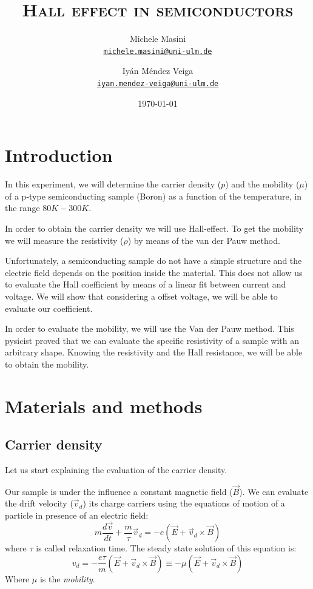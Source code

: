 \documentclass[11pt,a4paper]{article}
\title{\bfseries\textsc{Hall effect in semiconductors}}
\author{
Michele Masini\\ \small\texttt{\href{mailto:michele.masini@uni-ulm.de}{michele.masini@uni-ulm.de}}\and
Iyán Méndez Veiga\\ \small\texttt{\href{mailto:iyan.mendez-veiga@uni-ulm.de}{iyan.mendez-veiga@uni-ulm.de}}
}
\date{\today}
\begin{document}
\maketitle



\section{Introduction}
In this experiment, we will determine the carrier density ($p$) and the mobility ($\mu$) of a p-type semiconducting sample (Boron) as a function of the temperature, in the range $80K-300K$.

In order to obtain the carrier density we will use Hall-effect. To get the mobility we will measure the resistivity ($\rho$) by means of the van der Pauw method. 

Unfortunately, a semiconducting sample do not have a simple structure and the electric field depends on the position inside the material. This does not allow us to evaluate the Hall coefficient by means of a linear fit between current and voltage. We will show that considering a offset voltage, we will be able to evaluate our coefficient.

In order to evaluate the mobility, we will use the Van der Pauw method. This pysicist proved that we can evaluate the specific resistivity of a sample with an arbitrary shape. Knowing the resistivity and the Hall resistance, we will be able to obtain the mobility. 

\section{Materials and methods}
\subsection{Carrier density}
Let us start explaining the evaluation of the carrier density.

Our sample is under the influence a constant magnetic field ($\vec{B}$). We can evaluate the drift velocity ($\vec{v}_d$) its charge carriers using the equations of motion of a particle in presence of an electric field:
\begin{equation*}
m\frac{d\vec{v}}{dt}+\frac{m}{\tau}\vec{v}_d=-e(\vec{E}+\vec{v}_d\times\vec{B})
\end{equation*} where $\tau$ is called relaxation time. The steady state solution of this equation is: 
\begin{equation}
v_d=-\frac{e\tau}{m}(\vec{E}+\vec{v}_d\times\vec{B})\equiv -\mu (\vec{E}+\vec{v}_d\times\vec{B})
\end{equation}Where $\mu$ is the \emph{mobility}. %
\end{document}
